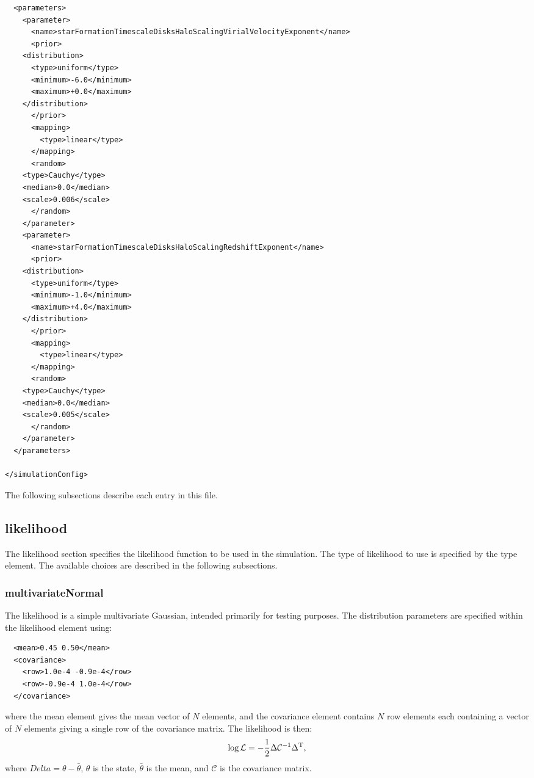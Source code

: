 \begin{verbatim}
  <parameters>
    <parameter>
      <name>starFormationTimescaleDisksHaloScalingVirialVelocityExponent</name>
      <prior>
	<distribution>
	  <type>uniform</type>
	  <minimum>-6.0</minimum>
	  <maximum>+0.0</maximum>
	</distribution>
      </prior>
      <mapping>
        <type>linear</type>
      </mapping>
      <random>
	<type>Cauchy</type>
	<median>0.0</median>
	<scale>0.006</scale>
      </random>
    </parameter>
    <parameter>
      <name>starFormationTimescaleDisksHaloScalingRedshiftExponent</name>
      <prior>
	<distribution>
	  <type>uniform</type>
	  <minimum>-1.0</minimum>
	  <maximum>+4.0</maximum>
	</distribution> 
      </prior>
      <mapping>
        <type>linear</type>
      </mapping>
      <random>
	<type>Cauchy</type>
	<median>0.0</median>
	<scale>0.005</scale>
      </random>
    </parameter>
  </parameters>
  
</simulationConfig>
\end{verbatim}

The following subsections describe each entry in this file.

\subsection{{\normalfont \ttfamily likelihood}}

The {\normalfont \ttfamily likelihood} section specifies the likelihood function to be used in the simulation. The type of likelihood to use is specified by the {\normalfont \ttfamily type} element. The available choices are described in the following subsections.

\subsubsection{multivariateNormal}

The likelihood is a simple multivariate Gaussian, intended primarily for testing purposes. The distribution parameters are specified within the {\normalfont \ttfamily likelihood} element using:
\begin{verbatim}
  <mean>0.45 0.50</mean>
  <covariance>
    <row>1.0e-4 -0.9e-4</row>
    <row>-0.9e-4 1.0e-4</row>
  </covariance>
\end{verbatim}
where the {\normalfont \ttfamily mean} element gives the mean vector of $N$ elements, and the {\normalfont \ttfamily covariance} element contains $N$ {\normalfont \ttfamily row} elements each containing a vector of $N$ elements giving a single row of the covariance matrix. The likelihood is then:
\begin{equation}
\log \mathcal{L} = - {1 \over 2} \Delta \mathcal{C}^{-1} \Delta^{\mathrm T},
\end{equation}
where $Delta = \theta - \bar{\theta}$, $\theta$ is the state, $\bar{\theta}$ is the mean, and $\mathcal{C}$ is the covariance matrix.

